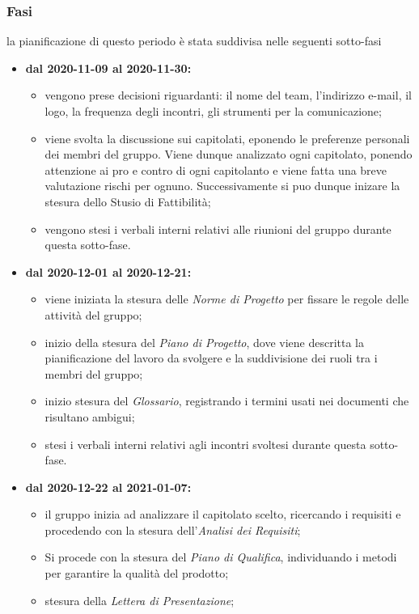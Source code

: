 \subsubsection{Fasi}
la pianificazione di questo periodo è stata suddivisa nelle seguenti sotto-fasi
\begin{itemize}
	\item \textbf{dal 2020-11-09 al 2020-11-30:}
	\begin{itemize}
	\item vengono prese decisioni riguardanti: il nome del team, l'indirizzo e-mail, il logo, la frequenza degli incontri, gli strumenti per la comunicazione;
	\item viene svolta la discussione sui capitolati, eponendo le preferenze personali dei membri del gruppo. Viene dunque analizzato ogni capitolato, ponendo attenzione ai pro e contro di ogni capitolanto e viene fatta una breve valutazione rischi per ognuno. Successivamente si puo dunque inizare la stesura dello Stusio di Fattibilità;
	\item vengono stesi i verbali interni relativi alle riunioni del gruppo durante questa sotto-fase.
	\end{itemize}
	\item \textbf{dal 2020-12-01 al 2020-12-21:}
	\begin{itemize}
		\item viene iniziata la stesura delle \textit{Norme di Progetto} per fissare le regole delle attività del gruppo;
		\item inizio della stesura del \textit{Piano di Progetto}, dove viene descritta la pianificazione del lavoro da svolgere e la suddivisione dei ruoli tra i membri del gruppo;
		\item inizio stesura del \textit{Glossario}, registrando i termini usati nei documenti che risultano ambigui;
		\item stesi i verbali interni relativi agli incontri svoltesi durante questa sotto-fase.
	\end{itemize}
	\item \textbf{dal 2020-12-22 al 2021-01-07:}
	\begin{itemize}
		\item il gruppo inizia ad analizzare il capitolato scelto, ricercando i requisiti e procedendo con la stesura dell'\textit{Analisi dei Requisiti};
		\item Si procede con la stesura del \textit{Piano di Qualifica}, individuando i metodi per garantire la qualità del prodotto;
		\item stesura della \textit{Lettera di Presentazione};

\end{itemize}
\end{itemize}
